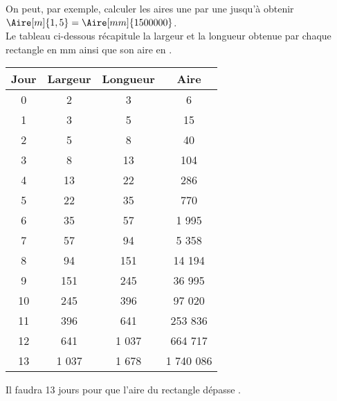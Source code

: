 \begin{corrige}
   On peut, par exemple, calculer les aires une par une jusqu'à obtenir $\Aire[m]{1,5} = \Aire[mm]{1500000}$. \\
   Le tableau ci-dessous récapitule la largeur et la longueur obtenue par chaque rectangle en mm ainsi que son aire en \Aire[mm]. \medskip
   
   \begin{tabular}{|c|c|c|c|}
      \hline
      Jour & Largeur & Longueur & Aire \\
      \hline
      0 & 2 & 3 & 6 \\
      \hline
      1 & 3 & 5 & 15 \\
      \hline
      2 & 5 & 8 & 40 \\
      \hline
      3 & 8 & 13 & 104 \\
      \hline
      4 & 13 & 22 & 286 \\
      \hline
      5 & 22 & 35 & 770 \\
      \hline
      6 & 35 & 57 & 1 995 \\
      \hline
      7 & 57 & 94 & 5 358 \\
      \hline
      8 & 94 & 151 & 14 194 \\
      \hline
      9 & 151 & 245 & 36 995 \\
      \hline
      10 & 245 & 396 & 97 020 \\
      \hline
      11 & 396 & 641 & 253 836 \\
      \hline
      12 & 641 & 1 037 & 664 717 \\
      \hline
      13 & 1 037 & 1 678 & 1 740 086 \\
      \hline
   \end{tabular}
   \medskip
   
   {\red Il faudra 13 jours pour que l'aire du rectangle dépasse .}
\end{corrige}